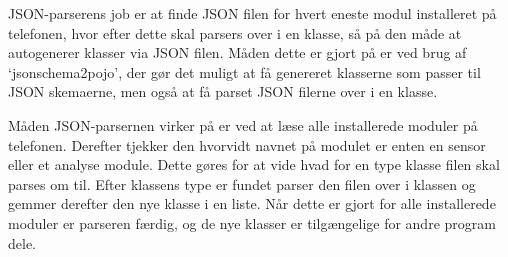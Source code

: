 JSON-parserens job er at finde JSON filen for hvert eneste modul installeret på telefonen, hvor efter dette skal parsers over i en klasse, så på den måde at autogenerer klasser via JSON filen.
Måden dette er gjort på er ved brug af `jsonschema2pojo', der gør det muligt at få genereret klasserne som passer til JSON skemaerne, men også at få parset JSON filerne over i en klasse.

Måden JSON-parsernen virker på er ved at læse alle installerede moduler på telefonen.
Derefter tjekker den hvorvidt navnet på modulet er enten en sensor eller et analyse module.
Dette gøres for at vide hvad for en type klasse filen skal parses om til.
Efter klassens type er fundet parser den filen over i klassen og gemmer derefter den nye klasse i en liste.
Når dette er gjort for alle installerede moduler er parseren færdig, og de nye klasser er tilgængelige for andre program dele.